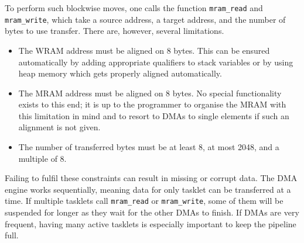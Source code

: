 To perform such blockwise moves, one calls the \langC{} function \lstinline|mram_read| and \lstinline|mram_write|, which take a source address, a target address, and the number of bytes to use transfer.
There are, however, several limitations.
\begin{itemize}
	\item
	The \ac{WRAM} address must be aligned on 8 bytes.
	This can be ensured automatically by adding appropriate qualifiers to stack variables or by using heap memory which gets properly aligned automatically.

	\item
	The \ac{MRAM} address must be aligned on 8 bytes.
	No special functionality exists to this end;
	it is up to the programmer to organise the \ac{MRAM} with this limitation in mind and to resort to \acp{DMA} to single elements if such an alignment is not given.

	\item
	The number of transferred bytes must be at least 8, at most 2048, and a multiple of 8.
\end{itemize}
Failing to fulfil these constraints can result in missing or corrupt data.
The \ac{DMA} engine works sequentially, meaning data for only tasklet can be transferred at a time.
If multiple tasklets call \lstinline|mram_read| or \lstinline|mram_write|, some of them will be suspended for longer as they wait for the other \acp{DMA} to finish.
If \acp{DMA} are very frequent, having many active tasklets is especially important to keep the pipeline full.

